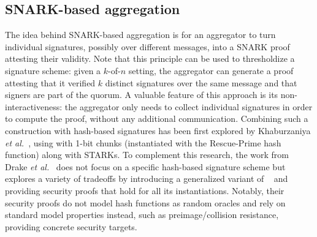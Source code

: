 \subsection{SNARK-based aggregation}
The idea behind SNARK-based aggregation is for an aggregator to turn individual signatures, possibly over different messages, into a SNARK proof attesting their validity.
Note that this principle can be used to thresholdize a signature scheme: given a $k$-of-$n$ setting, the aggregator can generate a proof attesting that it verified $k$ distinct signatures over the same message and that signers are part of the quorum.  
A valuable feature of this approach is its non-interactiveness: the aggregator only needs to collect individual signatures in order to compute the proof, without any additional communication.
Combining such a construction with hash-based signatures has been first explored by Khaburzaniya \textit{et al.}~\cite{agg-hash-based-starks}, using \WOTS with 1-bit chunks (instantiated with the \textsf{Rescue-Prime} hash function) along with STARKs.
To complement this research, the work from Drake \textit{et al.}~\cite{cryptoeprint:2025/055} does not focus on a specific hash-based signature scheme but explores a variety of tradeoffs by introducing a generalized variant of \XMSS~\cite{10.1007/978-3-642-25405-5_8} and providing security proofs that hold for all its instantiations.
Notably, their security proofs do not model hash functions as random oracles and rely on standard model properties instead, such as preimage/collision resistance, providing concrete security targets. 
